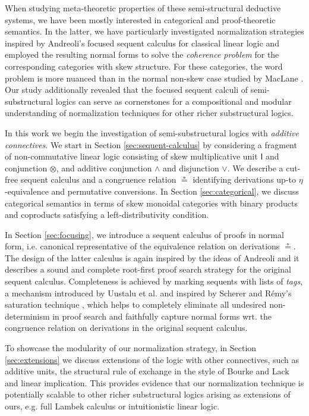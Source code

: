 \documentclass[submission,copyright,creativecommons]{eptcs}
\theoremstyle{definition}
\newcommand{\ot}{\otimes}
\newcommand{\I}{\mathsf{I}}
\begin{document}
When studying meta-theoretic properties of these semi-structural deductive systems, we have been mostly interested in categorical and proof-theoretic semantics. In the latter, we have particularly investigated normalization strategies inspired by Andreoli's focused sequent calculus for classical linear logic \cite{andreoli:logic:1992} and employed the resulting normal forms to solve the \emph{coherence problem} for the corresponding categories with skew structure. For these categories, the word problem is more nuanced than in the normal non-skew case studied by MacLane \cite{maclane1963natural}. Our study additionally revealed that the focused sequent calculi of semi-substructural logics can serve as cornerstones for a compositional and modular understanding of normalization techniques for other richer substructural logics.

In this work we begin the investigation of  semi-substructural logics with \emph{additive connectives}. We start in Section \ref{sec:sequent-calculus} by considering a fragment of non-commutative linear logic consisting of skew multiplicative unit $\I$ and conjunction $\ot$, and additive conjunction $\land$ and disjunction $\lor$. We describe a cut-free sequent calculus and a congruence relation $\circeq$ identifying derivations up-to $\eta$-equivalence and permutative conversions. In Section \ref{sec:categorical}, we discuss categorical semantics in terms of skew monoidal categories with binary products and coproducts satisfying a left-distributivity condition.

In Section \ref{sec:focusing}, we introduce a sequent calculus of proofs in normal form, i.e. canonical representative of the equivalence relation on derivations $\circeq$. The design of the latter calculus is again inspired by the ideas of Andreoli and it describes a sound and complete root-first proof search strategy for the original sequent calculus. Completeness is achieved by marking sequents with lists of \emph{tags}, a mechanism introduced by Uustalu et al. \cite{UVW:protsn} and inspired by Scherer and R{\'e}my's saturation technique \cite{scherer:simple:2015}, which helps to completely eliminate all undesired non-determinism in proof search and faithfully capture normal forms wrt. the congruence relation on derivations in the original sequent calculus. %

To showcase the modularity of our normalization strategy, in Section \ref{sec:extensions} we discuss extensions of the logic with other connectives, such as additive units, the structural rule of exchange in the style of Bourke and Lack and linear implication.
This provides evidence that our normalization technique is potentially scalable to  other richer substructural logics arising as extensions of ours, e.g. full Lambek calculus or intuitionistic linear logic.
\end{document}
